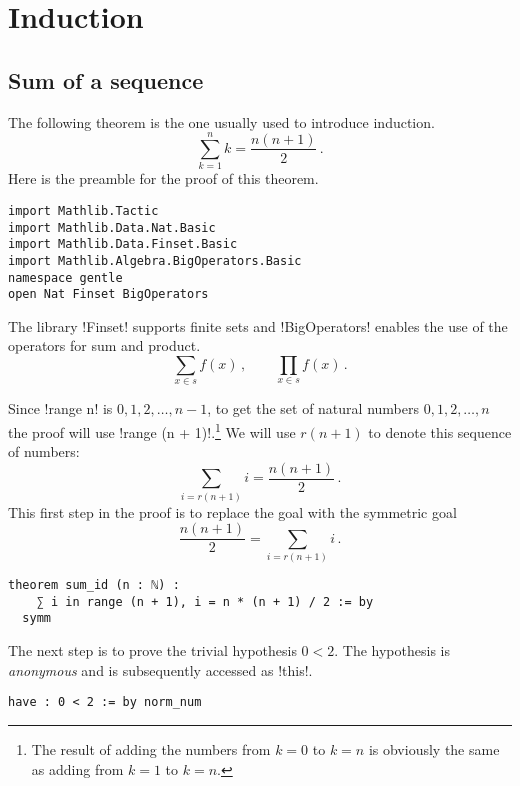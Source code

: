 
\section{Induction}

\subsection{Sum of a sequence}

The following theorem is the one usually used to introduce induction.
\[
\sum_{k=1}^{n} k = \frac{n(n+1)}{2}\,.
\]
Here is the preamble for the proof of this theorem.
\begin{Verbatim}
import Mathlib.Tactic
import Mathlib.Data.Nat.Basic
import Mathlib.Data.Finset.Basic
import Mathlib.Algebra.BigOperators.Basic
namespace gentle
open Nat Finset BigOperators
\end{Verbatim}

The library !Finset! supports finite sets and !BigOperators! enables the use of the operators for sum and product.
\[
\sum_{x\in s} f(x)\,, \quad \quad \prod_{x\in s} f(x)\,.
\]


Since !range n! is $0,1,2,\ldots,n-1$, to get the set of natural numbers $0,1,2,\ldots,n$ the proof will use !range (n + 1)!.\footnote{The result of adding the numbers from $k=0$ to $k=n$ is obviously the same as adding from $k=1$ to $k=n$.}  We will use $r(n+1)$ to denote this sequence of numbers:
\[
\sum_{i=r(n+1)} i = \frac{n(n+1)}{2}\,.
\]
This first step in the proof is to replace the goal with the symmetric goal
\[
\frac{n(n+1)}{2} = \sum_{i=r(n+1)} i\,.
\]
\begin{Verbatim}[firstnumber=last]
theorem sum_id (n : ℕ) :
    ∑ i in range (n + 1), i = n * (n + 1) / 2 := by
  symm
\end{Verbatim}


The next step is to prove the trivial hypothesis $0<2$. The hypothesis is \emph{anonymous} and is subsequently accessed as !this!.
\begin{Verbatim}[firstnumber=last]
  have : 0 < 2 := by norm_num
\end{Verbatim}


